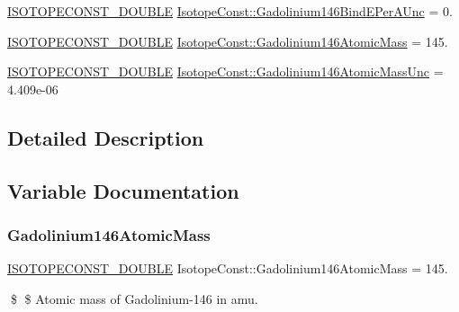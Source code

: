 \begin{DoxyCompactItemize}
\item 
\mbox{\hyperlink{group___isotope_const-_macros_ga8f45a7272ce02c0b4c65c44636ed719a}{I\+S\+O\+T\+O\+P\+E\+C\+O\+N\+S\+T\+\_\+\+D\+O\+U\+B\+LE}} \mbox{\hyperlink{group___isotope_const-_gadolinium-_gd146_gaa60eda27057a0e035ceeafdbc5e470c9}{Isotope\+Const\+::\+Gadolinium146\+Bind\+E\+Per\+A\+Unc}} = 0.
\item 
\mbox{\hyperlink{group___isotope_const-_macros_ga8f45a7272ce02c0b4c65c44636ed719a}{I\+S\+O\+T\+O\+P\+E\+C\+O\+N\+S\+T\+\_\+\+D\+O\+U\+B\+LE}} \mbox{\hyperlink{group___isotope_const-_gadolinium-_gd146_ga3d9f00481d963c5030f5b30345c52918}{Isotope\+Const\+::\+Gadolinium146\+Atomic\+Mass}} = 145.
\item 
\mbox{\hyperlink{group___isotope_const-_macros_ga8f45a7272ce02c0b4c65c44636ed719a}{I\+S\+O\+T\+O\+P\+E\+C\+O\+N\+S\+T\+\_\+\+D\+O\+U\+B\+LE}} \mbox{\hyperlink{group___isotope_const-_gadolinium-_gd146_gad5ecf0810d72082205ac52c256233ad4}{Isotope\+Const\+::\+Gadolinium146\+Atomic\+Mass\+Unc}} = 4.\+409e-\/06
\end{DoxyCompactItemize}


\subsection{Detailed Description}


\subsection{Variable Documentation}
\mbox{\label{group___isotope_const-_gadolinium-_gd146_ga3d9f00481d963c5030f5b30345c52918}} 
\subsubsection{\texorpdfstring{Gadolinium146\+Atomic\+Mass}{Gadolinium146AtomicMass}}
{\footnotesize\ttfamily \mbox{\hyperlink{group___isotope_const-_macros_ga8f45a7272ce02c0b4c65c44636ed719a}{I\+S\+O\+T\+O\+P\+E\+C\+O\+N\+S\+T\+\_\+\+D\+O\+U\+B\+LE}} Isotope\+Const\+::\+Gadolinium146\+Atomic\+Mass = 145.}

\$ \$ Atomic mass of Gadolinium-\/146 in amu. \mbox{\label{group___isotope_const-_gadolinium-_gd146_gad5ecf0810d72082205ac52c256233ad4}} 
